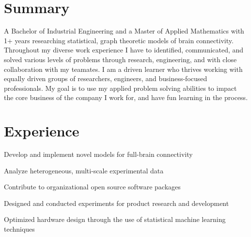 \documentclass[]{deedy-resume-openfont}
\begin{document}
\hfill
\begin{minipage}[t]{0.63\textwidth}

\section{Summary}
A Bachelor of Industrial Engineering and a Master of Applied Mathematics with
1+ years researching statistical, graph theoretic models of brain connectivity.
Throughout my diverse work experience I have to identified, communicated,
and solved various levels of problems through research, engineering, and with close collaboration
with my teamates. I am a driven learner who thrives working with equally
driven groups of researchers, engineers, and business-focused professionals. My
goal is to use my applied problem solving abilities to impact the core business
of the company I work for, and have fun learning in the process.
\sectionsep




\section{Experience}
\vspace{\topsep}
\begin{tightemize}
\item {Develop and implement novel models for full-brain connectivity}
\item {Analyze heterogeneous, multi-scale experimental data}
\item {Contribute to organizational open source software packages}
\end{tightemize}
\sectionsep

\begin{tightemize}
\item {Designed and conducted experiments for product research and development}
\item {Optimized hardware design through the use of statistical machine learning techniques}
\end{tightemize}
\sectionsep


\end{minipage}
\end{document}
